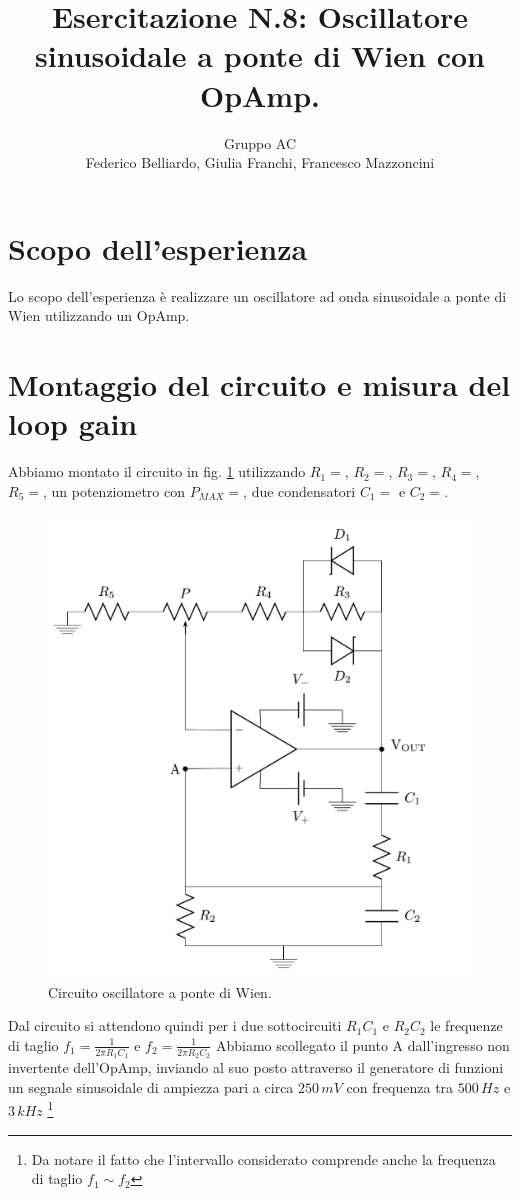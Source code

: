 \documentclass[10pt,a4paper]{article}
\author{Gruppo AC \\ Federico Belliardo, Giulia Franchi, Francesco Mazzoncini}
\title{Esercitazione N.8: Oscillatore sinusoidale a ponte di Wien con OpAmp.}
\begin{document}
\maketitle
\section{Scopo dell'esperienza}
Lo scopo dell'esperienza è realizzare un oscillatore ad onda sinusoidale a ponte di Wien utilizzando un OpAmp.
\section{Montaggio del circuito e misura del loop gain}
Abbiamo montato il circuito in fig. \ref{oscillatore} utilizzando $R_1=$, $R_2=$, $R_3=$, $R_4=$, $R_5=$, un potenziometro con $P_{MAX}=$, due condensatori $C_1=$ e $C_2=$.
\begin{figure}[!htb]
  \centering
  \includegraphics[scale=0.5]{pontediWien.png}
\caption{Circuito oscillatore a ponte di Wien.}
\label{oscillatore}
\end{figure}
Dal circuito si attendono quindi per i due sottocircuiti $R_1C_1$ e $R_2C_2$ le frequenze di taglio $f_1=\frac{1}{2 \pi R_1C_1}$ e $f_2=\frac{1}{2 \pi R_2C_2}$
Abbiamo scollegato il punto A dall'ingresso non invertente dell'OpAmp, inviando al suo posto attraverso il generatore di funzioni un segnale sinusoidale di ampiezza pari a circa $250\,mV$ con frequenza tra $500\,Hz$ e $3\,kHz$ \footnote{Da notare il fatto che l'intervallo considerato comprende anche la frequenza di taglio $f_1 \sim f_2$}
\end{document}
